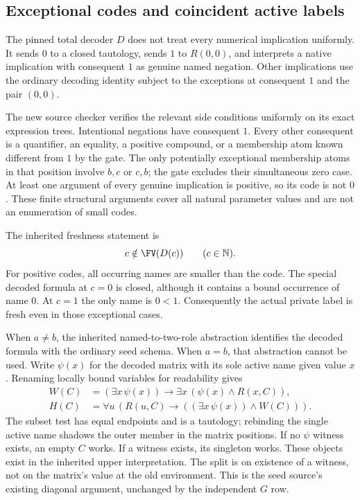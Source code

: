 \subsection{Exceptional codes and coincident active labels}

The pinned total decoder $D$ does not treat every numerical implication
uniformly. It sends $0$ to a closed tautology, sends $1$ to $R(0,0)$,
and interprets a native implication with consequent $1$ as genuine named
negation. Other implications use the ordinary decoding identity subject
to the exceptions at consequent $1$ and the pair $(0,0)$.

The new source checker verifies the relevant side conditions uniformly
on its exact expression trees. Intentional negations have consequent
$1$. Every other consequent is a quantifier, an equality, a positive
compound, or a membership atom known different from $1$ by the gate.
The only potentially exceptional membership atoms in that position
involve $b,c$ or $c,b$; the gate excludes their simultaneous zero case.
At least one argument of every genuine implication is positive, so its
code is not $0$. These finite structural arguments cover all natural
parameter values and are not an enumeration of small codes.

The inherited freshness statement is
\[
                    c\notin\FV(D(c))\qquad(c\in\mathbb N).
\]
For positive codes, all occurring names are smaller than the code. The
special decoded formula at $c=0$ is closed, although it contains a bound
occurrence of name $0$. At $c=1$ the only name is $0<1$. Consequently
the actual private label is fresh even in those exceptional cases.

When $a\ne b$, the inherited named-to-two-role abstraction identifies
the decoded formula with the ordinary seed schema. When $a=b$, that
abstraction cannot be used. Write $\psi(x)$ for the decoded matrix with
its sole active name given value $x$. Renaming locally bound variables
for readability gives
\begin{align*}
 W(C)&=(\exists x\,\psi(x))\to
                   \exists x\,(\psi(x)\land R(x,C)),\\
 H(C)&=\forall u\,(R(u,C)\to
                  ((\exists x\,\psi(x))\land W(C))).
\end{align*}
The subset test has equal endpoints and is a tautology; rebinding the
single active name shadows the outer member in the matrix positions.
If no $\psi$ witness exists, an empty $C$ works. If a witness exists,
its singleton works. These objects exist in the inherited upper
interpretation. The split is on existence of a witness, not on the
matrix's value at the old environment. This is the seed source's
existing diagonal argument, unchanged by the independent $G$ row.

